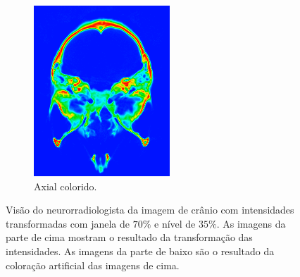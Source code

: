 \documentclass{article}
\begin{document}
\begin{figure}[h]
\begin{subfigure}[b]{0.3\textwidth}
        \includegraphics[width=\textwidth]{skull/neuroradiologist-axial.png}
        \caption{Axial colorido.}
    \end{subfigure}
    \caption{Visão do neurorradiologista da imagem de crânio com intensidades transformadas com janela de $70\%$ e nível de $35\%$. As imagens da parte de cima mostram o resultado da transformação das intensidades. As imagens da parte de baixo são o resultado da coloração artificial das imagens de cima.}
    \label{fig:skull-visao-neurorradiologista-cores}
\end{figure}
\end{document}
